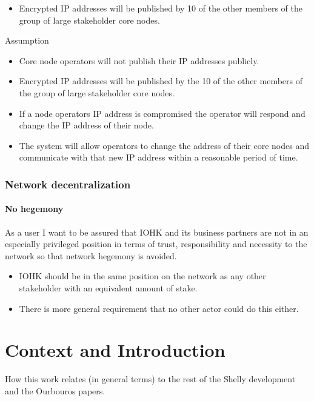 \documentclass{report}
\theoremstyle{definition}{
  \newtheorem{lemma}{Lemma}[section] %
  \newtheorem{definition}[lemma]{Definition}
}
\theoremstyle{theorem}{
  \newtheorem{invariant}[lemma]{Invariant}
  \newtheorem{proofobligation}[lemma]{Proof Obligation}
}
\numberwithin{equation}{lemma}
\begin{document}
\begin{itemize}
\item Encrypted IP addresses will be published by 10 of the other members of
      the group of large stakeholder core nodes.
\end{itemize}

Assumption

\begin{itemize}
\item Core node operators will not publish their IP addresses publicly.
\item Encrypted IP addresses will be published by the 10 of the other members
      of the group of large stakeholder core nodes.
\item If a node operators IP address is compromised the operator will respond
      and change the IP address of their node.
\item The system will allow operators to change the address of their core nodes
      and communicate with that new IP address within a reasonable period of
      time.
\end{itemize}


\subsubsection{Network decentralization}

\paragraph{No hegemony}

As a user I want to be assured that IOHK and its business partners are not in
an especially privileged position in terms of trust, responsibility and
necessity to the network so that network hegemony is avoided.

\begin{itemize}
\item IOHK should be in the same position on the network as any other
      stakeholder with an equivalent amount of stake.
\item There is more general requirement that no other actor could do this
      either.
\end{itemize}

\section{Context and Introduction}

How this work relates (in general terms) to the rest of the Shelly
development and the Ourbouros papers.
\end{document}
